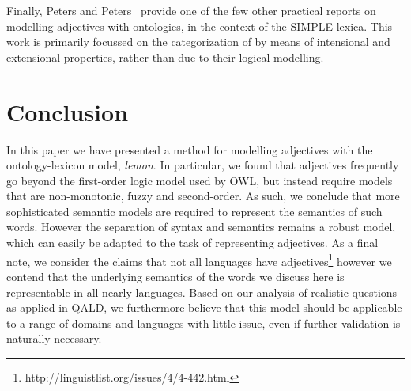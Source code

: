 \documentclass[11pt]{article}
\begin{document}
Finally, Peters and Peters~ provide one of the few other practical reports on modelling adjectives with ontologies, in the context of the SIMPLE lexica. This work is primarily focussed on the categorization of by means of intensional and extensional properties, rather than due to their logical modelling. 

\section{Conclusion}

In this paper we have presented a method for modelling adjectives with the
ontology-lexicon model, \emph{lemon}. In particular, we found that adjectives
frequently go beyond the first-order logic model used by OWL, but instead 
require models that are non-monotonic, fuzzy and second-order. As such, we 
conclude that more sophisticated semantic models are required to represent the semantics
of such words. However the separation of syntax and semantics remains a robust
model, which can easily be adapted to the task of representing adjectives. As 
a final note, we consider the claims that not all languages have adjectives\footnote{http://linguistlist.org/issues/4/4-442.html} however we contend that the underlying semantics of the words we discuss here
is representable in all nearly languages. Based on our analysis of realistic
questions as applied in QALD, we furthermore believe that this model should be applicable
to a range of domains and languages with little issue, even if further 
validation is naturally necessary.

\begin{spacing}{.4}


\end{spacing}
\end{document}
